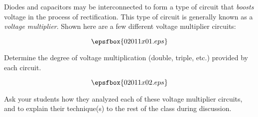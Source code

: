 

Diodes and capacitors may be interconnected to form a type of circuit that {\it boosts} voltage in the process of rectification.  This type of circuit is generally known as a {\it voltage multiplier}.  Shown here are a few different voltage multiplier circuits:

$$\epsfbox{02011x01.eps}$$

Determine the degree of voltage multiplication (double, triple, etc.) provided by each circuit.







$$\epsfbox{02011x02.eps}$$







Ask your students how they analyzed each of these voltage multiplier circuits, and to explain their technique(s) to the rest of the class during discussion.




